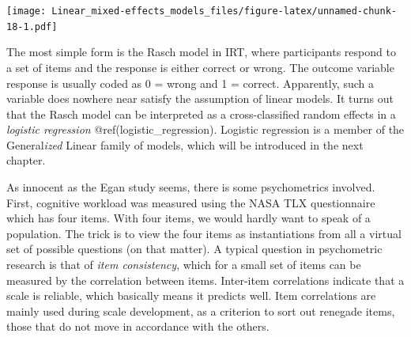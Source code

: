 \documentclass[]{svmono}
\newenvironment{Shaded}{\begin{snugshade}}{\end{snugshade}}
\newcommand{\KeywordTok}[1]{\textcolor[rgb]{0.13,0.29,0.53}{\textbf{#1}}}
\newcommand{\DataTypeTok}[1]{\textcolor[rgb]{0.13,0.29,0.53}{#1}}
\newcommand{\DecValTok}[1]{\textcolor[rgb]{0.00,0.00,0.81}{#1}}
\newcommand{\StringTok}[1]{\textcolor[rgb]{0.31,0.60,0.02}{#1}}
\newcommand{\OperatorTok}[1]{\textcolor[rgb]{0.81,0.36,0.00}{\textbf{#1}}}
\newcommand{\NormalTok}[1]{#1}
\theoremstyle{definition}
\theoremstyle{definition}
\theoremstyle{definition}
\theoremstyle{remark}
\begin{document}
\begin{Shaded}
\end{Shaded}

\texttt{[image: Linear\_mixed-effects\_models\_files/figure-latex/unnamed-chunk-18-1.pdf]}

The most simple form is the Rasch model in IRT, where participants
respond to a set of items and the response is either correct or wrong.
The outcome variable response is usually coded as 0 = wrong and 1 =
correct. Apparently, such a variable does nowhere near satisfy the
assumption of linear models. It turns out that the Rasch model can be
interpreted as a cross-classified random effects in a \emph{logistic
regression} @ref(logistic\_regression). Logistic regression is a member
of the General\emph{ized} Linear family of models, which will be
introduced in the next chapter.

As innocent as the Egan study seems, there is some psychometrics
involved. First, cognitive workload was measured using the NASA TLX
questionnaire which has four items. With four items, we would hardly
want to speak of a population. The trick is to view the four items as
instantiations from all a virtual set of possible questions (on that
matter). A typical question in psychometric research is that of
\emph{item consistency}, which for a small set of items can be measured
by the correlation between items. Inter-item correlations indicate that
a scale is reliable, which basically means it predicts well. Item
correlations are mainly used during scale development, as a criterion to
sort out renegade items, those that do not move in accordance with the
others.
\end{document}
